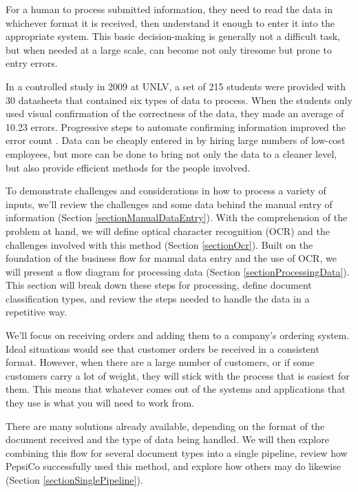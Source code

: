 \documentclass[conference]{IEEEtran}
\begin{document}
For a human to process submitted information, they need to read the data in whichever format it is received, then understand it enough to enter it into the appropriate system. This basic decision-making is generally not a difficult task, but when needed at a large scale, can become not only tiresome but prone to entry errors. 

In a controlled study in 2009 at UNLV, a set of 215 students were provided with 30 datasheets that contained six types of data to process. When the students only used visual confirmation of the correctness of the data, they made an average of 10.23 errors. Progressive steps to automate confirming information improved the error count \cite{harris2014when}. Data can be cheaply entered in by hiring large numbers of low-cost employees, but more can be done to bring not only the data to a cleaner level, but also provide efficient methods for the people involved.

To demonstrate challenges and considerations in how to process a variety of inputs, we'll review the challenges and some data behind the manual entry of information (Section \ref{sectionManualDataEntry}). With the comprehension of the problem at hand, we will define optical character recognition (OCR) and the challenges involved with this method (Section \ref{sectionOcr}). Built on the foundation of the business flow for manual data entry and the use of OCR, we will present a flow diagram for processing data (Section \ref{sectionProcessingData}). This section will break down these steps for processing, define document classification types, and review the steps needed to handle the data in a repetitive way.

We'll focus on receiving orders and adding them to a company's ordering system. Ideal situations would see that customer orders be received in a consistent format. However, when there are a large number of customers, or if some customers carry a lot of weight, they will stick with the process that is easiest for them. This means that whatever comes out of the systems and applications that they use is what you will need to work from.

There are many solutions already available, depending on the format of the document received and the type of data being handled. We will then explore combining this flow for several document types into a single pipeline, review how PepsiCo successfully used this method, and explore how others may do likewise (Section \ref{sectionSinglePipeline}).
\end{document}
